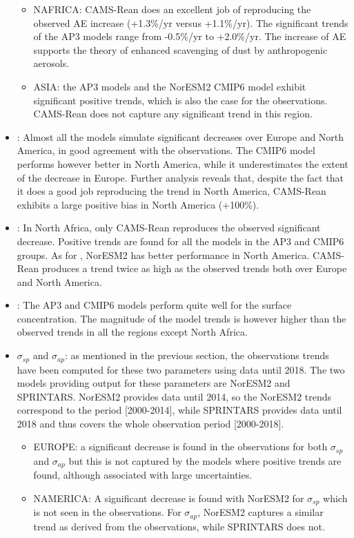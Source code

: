 \documentclass[acp, manuscript]{copernicus}
\begin{document}
\begin{itemize}
\begin{itemize}
        \item NAFRICA: CAMS-Rean does an excellent job of reproducing the observed AE increase (+1.3\%/yr versus +1.1\%/yr). The significant trends of the AP3 models range from -0.5\%/yr to +2.0\%/yr. The increase of AE supports the theory of enhanced scavenging of dust by anthropogenic aerosols.
        \item ASIA: the AP3 models and the NorESM2 CMIP6 model exhibit significant positive trends, which is also the case for the observations. CAMS-Rean does not capture any significant trend in this region.
       \end{itemize}
 \item {}: Almost all the models simulate significant decreases over Europe and North America, in good agreement with the observations. The CMIP6 model performs however better in North America, while it underestimates the extent of the decrease in Europe. Further analysis reveals that, despite the fact that it does a good job reproducing the  trend in North America, CAMS-Rean exhibits a large positive bias in North America (+100\%).
 \item {}: In North Africa, only CAMS-Rean reproduces the observed significant decrease. Positive trends are found for all the models in the AP3 and CMIP6 groups. As for , NorESM2 has better performance in North America. CAMS-Rean produces a trend twice as high as the observed trends both over Europe and North America.
 \item {}: The AP3 and CMIP6 models perform quite well for the  surface concentration. The magnitude of the model trends is however higher than the observed trends in all the regions except North Africa.
 \item $\sigma_{sp}$ and $\sigma_{ap}$:  as mentioned in the previous section, the observations trends have been computed for these two parameters using data until 2018. The two models providing output for these parameters are NorESM2 and SPRINTARS. NorESM2 provides data until 2014, so the NorESM2 trends correspond to the period [2000-2014], while SPRINTARS provides data until 2018 and thus covers the whole observation period [2000-2018].
       \begin{itemize}
        \item EUROPE: a significant decrease is found in the observations for both $\sigma_{sp}$ and $\sigma_{ap}$ but this is not captured by the models where positive trends are found, although associated with large uncertainties.
        \item NAMERICA: A significant decrease is found with NorESM2 for $\sigma_{sp}$ which is not seen in the observations. For $\sigma_{ap}$, NorESM2 captures a similar trend as derived from the observations, while SPRINTARS does not.
       \end{itemize}
\end{itemize}
\end{document}
